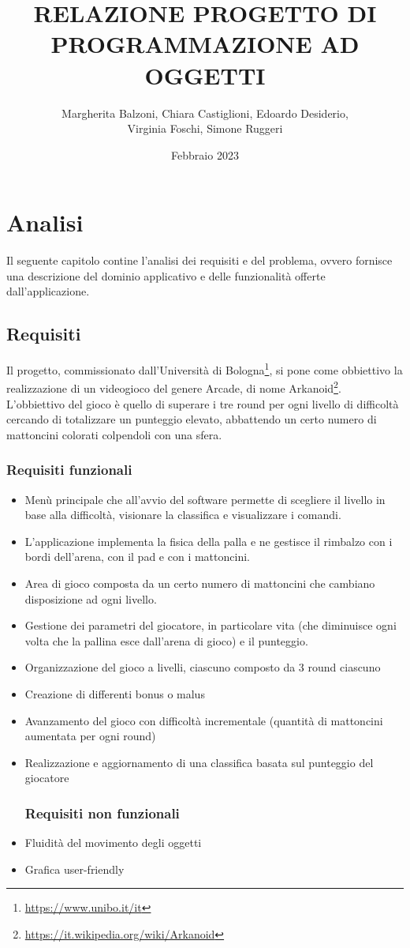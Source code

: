 \documentclass[a4paper,12pt]{report}
\title{RELAZIONE PROGETTO DI PROGRAMMAZIONE AD OGGETTI}
\author{Margherita Balzoni, Chiara Castiglioni, Edoardo Desiderio, \\Virginia Foschi, Simone Ruggeri}
\date{Febbraio 2023}
\begin{document}
\maketitle
\titlepage
\tableofcontents
\newpage

\chapter{Analisi}
Il seguente capitolo contine l'analisi dei requisiti e del problema, ovvero fornisce una descrizione del dominio applicativo e delle funzionalità offerte dall'applicazione.
\section{Requisiti}
Il progetto, commissionato dall'Università di Bologna\footnote{\url{https://www.unibo.it/it}}, si pone come obbiettivo la realizzazione di un videogioco del genere Arcade, di nome Arkanoid\footnote{\url{https://it.wikipedia.org/wiki/Arkanoid}}.\\L'obbiettivo del gioco è quello di superare i tre round per ogni livello di difficoltà cercando di totalizzare un punteggio elevato, abbattendo un certo numero di mattoncini colorati colpendoli con una sfera.
\\
\subsection*{Requisiti funzionali}
\begin{itemize}
    \item Menù principale che all'avvio del software permette di scegliere il livello in base alla difficoltà, visionare la classifica e visualizzare i comandi.
    \item L’applicazione implementa la fisica della palla e ne gestisce il rimbalzo con i bordi dell’arena, con il pad e con i mattoncini.
    \item Area di gioco composta da un certo numero di mattoncini che cambiano disposizione ad ogni livello.
    \item Gestione dei parametri del giocatore, in particolare vita (che diminuisce ogni volta che la pallina esce dall'arena di gioco) e il punteggio.
    \item Organizzazione del gioco a livelli, ciascuno composto da 3 round ciascuno
    \item Creazione di differenti bonus o malus
    \item Avanzamento del gioco con difficoltà incrementale (quantità di mattoncini aumentata per ogni round)
    \item Realizzazione e aggiornamento di una classifica basata sul punteggio del giocatore
          \subsection*{Requisiti non funzionali}
    \item Fluidità del movimento degli oggetti
    \item Grafica user-friendly
\end{itemize}
\end{document}
